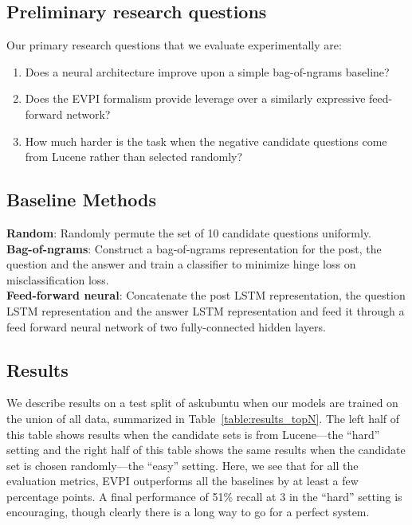 \documentclass[11pt,a4paper]{article}
\begin{document}
\subsection{Preliminary research questions}\label{experiments_results}
Our primary research questions that we evaluate experimentally are:
\begin{enumerate}
	\item Does a neural architecture improve upon a simple bag-of-ngrams baseline?
	\item Does the EVPI formalism provide leverage over a similarly expressive feed-forward network?
	\item How much harder is the task when the negative candidate questions come from Lucene rather than selected randomly?
\end{enumerate}

\subsection{Baseline Methods}\label{baselines}

\textbf{Random}: Randomly permute the set of 10 candidate questions uniformly.\\
\textbf{Bag-of-ngrams}: Construct a bag-of-ngrams representation for the post, the question and the answer and train a classifier to minimize hinge loss on misclassification loss. \\
\textbf{Feed-forward neural}: Concatenate the post LSTM representation, the question LSTM representation and the answer LSTM representation and feed it through a feed forward neural network of two fully-connected hidden layers.

\subsection{Results}

We describe results on a test split of askubuntu when our models are trained on the union of all data, summarized in Table~\ref{table:results_topN}. The left half of this table shows results when the candidate sets is from Lucene---the ``hard'' setting and the right half of this table shows the same results when the candidate set is chosen randomly---the ``easy'' setting. Here, we see that for all the evaluation metrics, EVPI outperforms all the baselines by at least a few percentage points. A final performance of 51\% recall at 3 in the ``hard'' setting is encouraging, though clearly there is a long way to go for a perfect system. 
\end{document}
